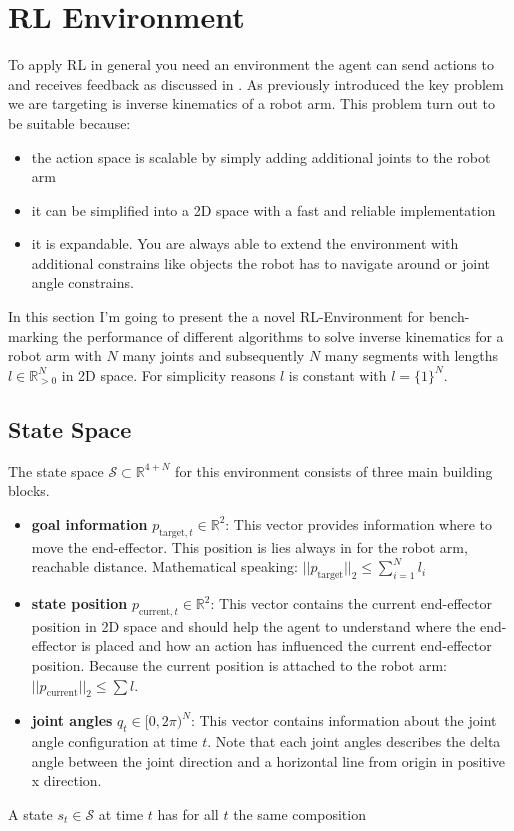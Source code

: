 \section{RL Environment}\label{sec:RL-Environment}

To apply RL in general you need an environment the agent can send actions to and receives feedback as discussed in . As previously introduced the key problem we are targeting is inverse kinematics of a robot arm. This problem turn out to be suitable because:
\begin{itemize}
    \item the action space is scalable by simply adding additional joints to the robot arm
    \item it can be simplified into a 2D space with a fast and reliable implementation
    \item it is expandable. You are always able to extend the environment with additional constrains like objects the robot has to navigate around or joint angle constrains.
\end{itemize}

In this section I'm going to present the a novel RL-Environment for bench-marking the performance of different algorithms to solve inverse kinematics for a robot arm with $N$ many joints and subsequently $N$ many segments with lengths $l \in\mathbb{R}_{>0}^N$ in 2D space. For simplicity reasons $l$ is constant with $l = \{ 1 \}^N$.

\subsection{State Space}

The state space $\mathcal{S} \subset \mathbb{R}^{4 + N}$ for this environment consists of three main building blocks. 

\begin{itemize}
    \item \textbf{goal information} $p_{\text{target}, t} \in \mathbb{R}^2$: This vector provides information where to move the end-effector. This position is lies always in for the robot arm, reachable distance. Mathematical speaking: $||p_\text{target}||_2 \leq \sum_{i = 1}^N l_i$ 
    \item \textbf{state position} $p_{\text{current},t} \in \mathbb{R}^2$: This vector contains the current end-effector position in 2D space and should help the agent to understand where the end-effector is placed and how an action has influenced the current end-effector position. Because the current position is attached to the robot arm: $||p_\text{current}||_2 \leq \sum l$.
    \item \textbf{joint angles} $q_t \in [0, 2\pi)^N$: This vector contains information about the joint angle configuration at time $t$. Note that each joint angles describes the delta angle between the joint direction and a horizontal line from origin in positive x direction.
\end{itemize}
A state $s_t \in \mathcal{S}$ at time $t$ has for all $t$ the same composition

